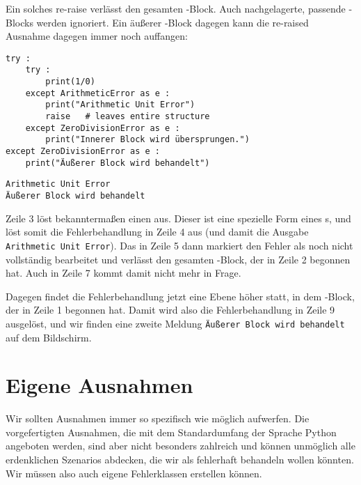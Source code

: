 Ein solches re-raise verlässt den gesamten -Block. Auch nachgelagerte, passende -Blocks werden ignoriert. Ein äußerer -Block dagegen kann die re-raised Ausnahme dagegen immer noch auffangen:
\begin{codebox}
\begin{verbatim}
try :
    try :
        print(1/0)
    except ArithmeticError as e :
        print("Arithmetic Unit Error")
        raise   # leaves entire structure
    except ZeroDivisionError as e :
        print("Innerer Block wird übersprungen.")
except ZeroDivisionError as e :
    print("Äußerer Block wird behandelt")
\end{verbatim}
\end{codebox}

\begin{cmdbox}
\begin{verbatim}
Arithmetic Unit Error
Äußerer Block wird behandelt
\end{verbatim}
\end{cmdbox}

Zeile 3 löst bekanntermaßen einen  aus. Dieser ist eine spezielle Form eines s, und löst somit die Fehlerbehandlung in Zeile 4 aus (und damit die Ausgabe \texttt{Arithmetic Unit Error}). Das  in Zeile 5 dann markiert den Fehler als noch nicht vollständig bearbeitet und verlässt den gesamten -Block, der in Zeile 2 begonnen hat. Auch  in Zeile 7 kommt damit nicht mehr in Frage.

Dagegen findet die Fehlerbehandlung jetzt eine Ebene höher statt, \ie in dem -Block, der in Zeile 1 begonnen hat. Damit wird also die Fehlerbehandlung in Zeile 9 ausgelöst, und wir finden eine zweite Meldung \texttt{Äußerer Block wird behandelt} auf dem Bildschirm.

\section{Eigene Ausnahmen}
Wir sollten Ausnahmen immer so spezifisch wie möglich aufwerfen. Die vorgefertigten Ausnahmen, die mit dem Standardumfang der Sprache Python angeboten werden, sind aber nicht besonders zahlreich und können unmöglich alle erdenklichen Szenarios abdecken, die wir als fehlerhaft behandeln wollen könnten. Wir müssen also auch eigene Fehlerklassen erstellen können.

